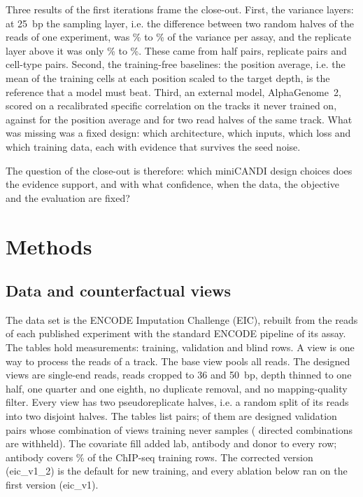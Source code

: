 \documentclass[pdflatex,sn-mathphys-num]{sn-jnl}
\newcommand{\lit}[1]{#1}
\newcommand{\cl}[1]{#1}
\begin{document}
\cl{Three results of the first iterations frame the close-out. First, the variance layers: at \lit{25}~bp the sampling layer, i.e. the difference between two random halves of the reads of one experiment, was \sampLo{}\% to \sampHi{}\% of the variance per assay, and the replicate layer above it was only \repLo{}\% to \repHi{}\%. These came from \nHalfPairs{} half pairs, \nIsoPairs{} replicate pairs and \nCtPairs{} cell-type pairs. Second, the training-free baselines: the position average, i.e. the mean of the training cells at each position scaled to the target depth, is the reference that a model must beat. Third, an external model, AlphaGenome~\lit{2}, scored \agFair{} on a recalibrated specific correlation on the tracks it never trained on, against \agPosAvg{} for the position average and \agFloor{} for two read halves of the same track. What was missing was a fixed design: which architecture, which inputs, which loss and which training data, each with evidence that survives the seed noise.}

\cl{The question of the close-out is therefore: which miniCANDI design choices does the evidence support, and with what confidence, when the data, the objective and the evaluation are fixed?}

\section{Methods}\label{sec:methods}

\subsection{Data and counterfactual views}

\cl{The data set is the ENCODE Imputation Challenge (EIC), rebuilt from the reads of each published experiment with the standard ENCODE pipeline of its assay. The tables hold \nRows{} measurements: \nRowsTrain{} training, \nRowsVal{} validation and \nRowsBlind{} blind rows. A view is one way to process the reads of a track. The base view pools all reads. The designed views are single-end reads, reads cropped to \lit{36} and \lit{50}~bp, depth thinned to one half, one quarter and one eighth, no duplicate removal, and no mapping-quality filter. Every view has two pseudoreplicate halves, i.e. a random split of its reads into two disjoint halves. The tables list \nPairsAll{} pairs; \nNeverTrained{} of them are designed validation pairs whose combination of views training never samples (\nWithheldCombos{} directed combinations are withheld). The covariate fill added lab, antibody and donor to every row; antibody covers \abTrainPct{}\% of the ChIP-seq training rows. The corrected version (\lit{eic\_v1\_2}) is the default for new training, and every ablation below ran on the first version (\lit{eic\_v1}).}
\end{document}
